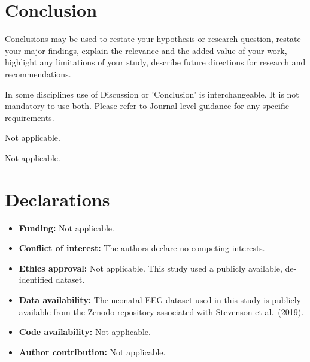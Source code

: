 \documentclass[pdflatex,sn-mathphys-num]{sn-jnl}%
\theoremstyle{thmstyleone}%
\theoremstyle{thmstyletwo}%
\theoremstyle{thmstylethree}%
\begin{document}
\section{Conclusion}\label{sec13}

Conclusions may be used to restate your hypothesis or research question, restate your major findings, explain the relevance and the added value of your work, highlight any limitations of your study, describe future directions for research and recommendations. 

In some disciplines use of Discussion or 'Conclusion' is interchangeable. It is not mandatory to use both. Please refer to Journal-level guidance for any specific requirements. 

\backmatter


Not applicable.


Not applicable.

\section*{Declarations}

\begin{itemize}
\item \textbf{Funding:} Not applicable.
\item \textbf{Conflict of interest:} The authors declare no competing interests.
\item \textbf{Ethics approval:} Not applicable. This study used a publicly available, de-identified dataset.
\item \textbf{Data availability:} The neonatal EEG dataset used in this study is publicly available from the Zenodo repository associated with Stevenson et al.\ (2019).
\item \textbf{Code availability:} Not applicable.
\item \textbf{Author contribution:} Not applicable.
\end{itemize}


% 
\end{document}
